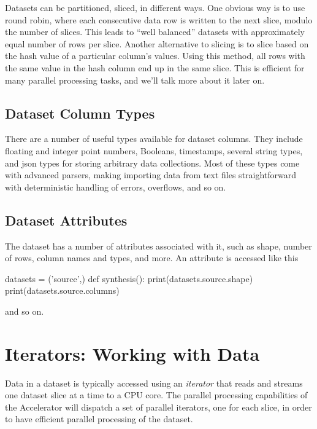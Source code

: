Datasets can be partitioned, sliced, in different ways.  One obvious
way is to use round robin, where each consecutive data row is written
to the next slice, modulo the number of slices.  This leads to ``well
balanced'' datasets with approximately equal number of rows per slice.
Another alternative to slicing is to slice based on the hash value of
a particular column's values.  Using this method, all rows with the
same value in the hash column end up in the same slice.  This is
efficient for many parallel processing tasks, and we'll talk more
about it later on.



\subsection{Dataset Column Types}

There are a number of useful types available for dataset columns.
They include floating and integer point numbers, Booleans, timestamps,
several string types, and json types for storing arbitrary data
collections.  Most of these types come with advanced parsers, making
importing data from text files straightforward with deterministic
handling of errors, overflows, and so on.



\subsection{Dataset Attributes}
The dataset has a number of attributes associated with it, such as
shape, number of rows, column names and types, and more.
An attribute is accessed like this
\begin{python}
datasets = ('source',)
def synthesis():
    print(datasets.source.shape)
    print(datasets.source.columns)
\end{python}
and so on.



\section{Iterators: Working with Data}

Data in a dataset is typically accessed using an \emph{iterator} that
reads and streams one dataset slice at a time to a CPU core.  The
parallel processing capabilities of the Accelerator will dispatch a
set of parallel iterators, one for each slice, in order to have
efficient parallel processing of the dataset.

